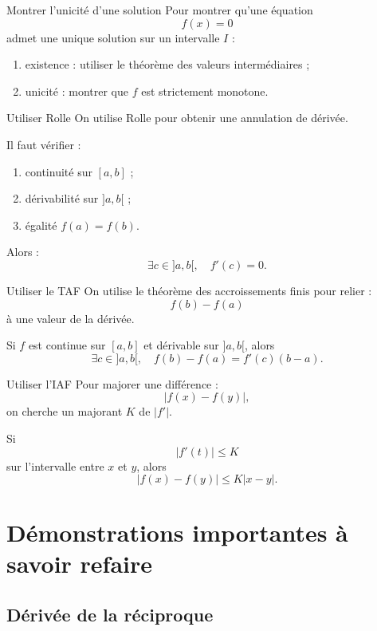 \documentclass[11pt,a4paper]{article}
\begin{document}
\begin{methodbox}{Montrer l'unicité d'une solution}
Pour montrer qu'une équation
\[
f(x)=0
\]
admet une unique solution sur un intervalle $I$ :
\begin{enumerate}[label=\arabic*)]
    \item existence : utiliser le théorème des valeurs intermédiaires ;
    \item unicité : montrer que $f$ est strictement monotone.
\end{enumerate}
\end{methodbox}

\begin{methodbox}{Utiliser Rolle}
On utilise Rolle pour obtenir une annulation de dérivée.

Il faut vérifier :
\begin{enumerate}[label=\arabic*)]
    \item continuité sur $[a,b]$ ;
    \item dérivabilité sur $]a,b[$ ;
    \item égalité $f(a)=f(b)$.
\end{enumerate}
Alors :
\[
\exists c\in]a,b[,\quad f'(c)=0.
\]
\end{methodbox}

\begin{methodbox}{Utiliser le TAF}
On utilise le théorème des accroissements finis pour relier :
\[
f(b)-f(a)
\]
à une valeur de la dérivée.

Si $f$ est continue sur $[a,b]$ et dérivable sur $]a,b[$, alors
\[
\exists c\in]a,b[,\quad f(b)-f(a)=f'(c)(b-a).
\]
\end{methodbox}

\begin{methodbox}{Utiliser l'IAF}
Pour majorer une différence :
\[
|f(x)-f(y)|,
\]
on cherche un majorant $K$ de $|f'|$.

Si
\[
|f'(t)|\leq K
\]
sur l'intervalle entre $x$ et $y$, alors
\[
|f(x)-f(y)|\leq K|x-y|.
\]
\end{methodbox}

\section{Démonstrations importantes à savoir refaire}

\subsection{Dérivée de la réciproque}
\end{document}
